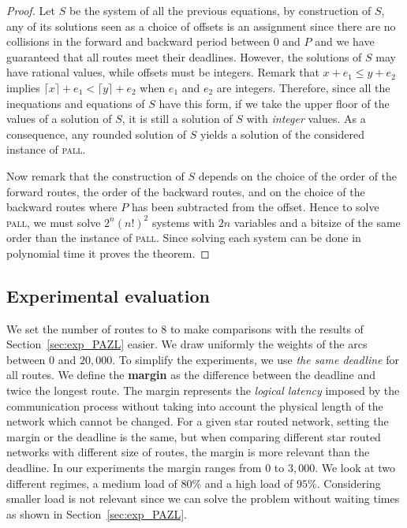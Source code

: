 \documentclass[10pt, conference, letterpaper]{IEEEtran}
\newcommand\pall{\textsc{pall}\xspace}
\begin{document}
\begin{proof}
 Let $S$ be the system of all the previous equations, by construction of $S$, any of its solutions seen as a choice of offsets 
is an assignment since there are no collisions in the forward and backward period between $0$ and $P$ and we have guaranteed that 
all routes meet their deadlines. However, the solutions of $S$ may have rational values, while offsets must be integers. 
Remark that $x +e_1 \leq y + e_2$ implies $\lceil x \rceil +e_1 < \lceil y \rceil + e_2$ when $e_1$ and $e_2$ are integers.
Therefore, since all the inequations and equations of $S$ have this form, if we take the upper floor of the values of a solution of $S$, it is still a solution of $S$ with \emph{integer} values. As a consequence, any rounded solution of $S$ yields a solution of the considered instance of \pall.

Now remark that the construction of $S$ depends on the choice of the order of the forward routes, the order of the backward routes, and on the choice of the backward routes where $P$ has been subtracted from the offset. Hence to solve \pall, we must solve $2^n(n!)^2$ systems with $2n$ variables and a bitsize of the same order than the instance of \pall. Since solving each system can be done in polynomial time it proves the theorem.
\end{proof}


    \subsection{Experimental evaluation}
    \label{sec:resultsPALL}
    
    We set the number of routes to $8$ to make comparisons with the results of Section~\ref{sec:exp_PAZL} easier. 
    We draw uniformly the weights of the arcs between $0$ and $20,000$. To simplify the experiments, 
    we use \emph{the same deadline} for all routes. We define the {\bf margin} as the difference between the deadline and twice the longest route. The margin represents the \emph{logical latency} imposed by the communication process without taking into account the physical length of the network which cannot be changed. For a given star routed network, setting the margin or the deadline is the same, but when comparing different star routed networks with different size of routes, the margin is more relevant than the deadline.
    In our experiments the margin ranges from  $0$ to $3,000$.
   We look at two different regimes, a medium load of $80\%$ and a high load of $95\%$.
   Considering smaller load is not relevant since we can solve the problem without waiting times as shown in Section~\ref{sec:exp_PAZL}. 
   
\end{document}
